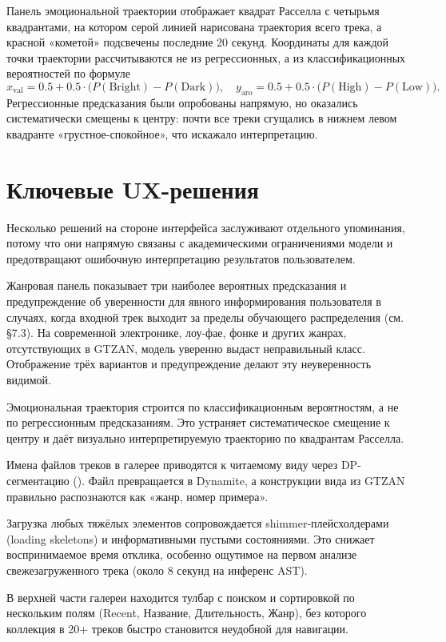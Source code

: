 Панель эмоциональной траектории отображает квадрат Расселла с четырьмя квадрантами, на котором серой линией нарисована траектория всего трека, а красной «кометой» подсвечены последние 20 секунд. Координаты для каждой точки траектории рассчитываются не из регрессионных, а из классификационных вероятностей по формуле
\[
x_{\text{val}} = 0.5 + 0.5 \cdot \big( P(\text{Bright}) - P(\text{Dark}) \big), \quad y_{\text{aro}} = 0.5 + 0.5 \cdot \big( P(\text{High}) - P(\text{Low}) \big).
\]
Регрессионные предсказания были опробованы напрямую, но оказались систематически смещены к центру: почти все треки сгущались в нижнем левом квадранте «грустное-спокойное», что искажало интерпретацию.

\section{Ключевые UX-решения}\label{sec:6-3}

Несколько решений на стороне интерфейса заслуживают отдельного упоминания, потому что они напрямую связаны с академическими ограничениями модели и предотвращают ошибочную интерпретацию результатов пользователем.

Жанровая панель показывает три наиболее вероятных предсказания и предупреждение об уверенности для явного информирования пользователя в случаях, когда входной трек выходит за пределы обучающего распределения (см. §7.3). На современной электронике, лоу-фае, фонке и других жанрах, отсутствующих в GTZAN, модель уверенно выдаст неправильный класс. Отображение трёх вариантов и предупреждение делают эту неуверенность видимой.

Эмоциональная траектория строится по классификационным вероятностям, а не по регрессионным предсказаниям. Это устраняет систематическое смещение к центру и даёт визуально интерпретируемую траекторию по квадрантам Расселла.

Имена файлов треков в галерее приводятся к читаемому виду через DP-сегментацию (). Файл  превращается в Dynamite, а конструкции вида  из GTZAN правильно распознаются как «жанр, номер примера».

Загрузка любых тяжёлых элементов сопровождается shimmer-плейсхолдерами (loading skeletons) и информативными пустыми состояниями. Это снижает воспринимаемое время отклика, особенно ощутимое на первом анализе свежезагруженного трека (около 8 секунд на инференс AST).

В верхней части галереи находится тулбар с поиском и сортировкой по нескольким полям (Recent, Название, Длительность, Жанр), без которого коллекция в 20+ треков быстро становится неудобной для навигации.

